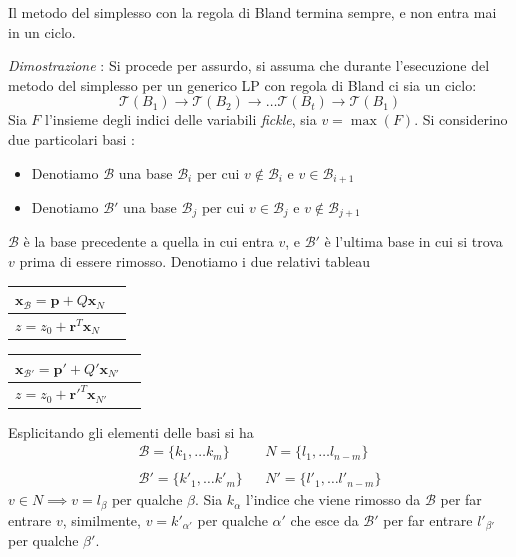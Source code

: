 \documentclass[10pt, letterpaper]{report}
\begin{document}
\begin{teorema}
    Il metodo del simplesso con la regola di Bland termina sempre, e non entra mai in un ciclo.
\end{teorema}
\textit{Dimostrazione} : Si procede per assurdo, si assuma che durante l'esecuzione del metodo del simplesso per un generico LP con regola di Bland ci sia un ciclo: 
$$\mathcal  T(B_1)\rightarrow\mathcal  T(B_2)\rightarrow\dots \mathcal  T(B_t)\rightarrow \mathcal  T(B_1)$$
Sia $F$ l'insieme degli indici delle variabili \textit{fickle}, sia $v=\max(F)$. Si considerino due particolari basi : \begin{itemize}
    \item Denotiamo $\mathcal B$ una base $\mathcal B_i$ per cui $v\notin \mathcal B_i$ e $v\in \mathcal B_{i+1}$
    \item  Denotiamo $\mathcal B'$ una base $\mathcal B_j$ per cui $v\in \mathcal B_j$ e $v\notin \mathcal B_{j+1}$
\end{itemize} 
$\mathcal B$ è la base precedente a quella in cui entra $v$, e $\mathcal B'$ è l'ultima base in cui si trova $v$ prima di essere rimosso. Denotiamo i due relativi tableau
\begin{center}
    \begin{tabular}{|l|l|}\hline 
       $\mathbf{x}_\mathcal{B} = \mathbf p + Q\mathbf x_N$\\ \hline 
       $z=z_0+\mathbf r^T\mathbf x_N$ \\\hline 
    \end{tabular}
    \begin{tabular}{|l|l|}\hline 
        $\mathbf{x}_\mathcal{B'} = \mathbf p' + Q'\mathbf x_{N'}$\\ \hline 
        $z=z_0+{\mathbf {r}'}^T\mathbf x_{N'}$ \\\hline 
     \end{tabular}
\end{center}
Esplicitando gli elementi delle basi si ha$$ \begin{matrix}
    \mathcal{B}=\{k_1,\dots k_m\} & & N=\{l_1,\dots l_{n-m}\}\\ \\
    \mathcal{B'}=\{k'_1,\dots k'_m\} & & N'=\{l'_1,\dots l'_{n-m}\}
\end{matrix}$$
$v\in N \implies v = l_\beta$ per qualche $\beta$. Sia $k_\alpha$ l'indice che viene rimosso da $\mathcal B$ per far entrare $v$, similmente, $v=k'_{\alpha'}$ per qualche $\alpha'$ che esce da $\mathcal B'$ per far entrare $l'_{\beta '}$ per qualche $\beta '$.
\end{document}
